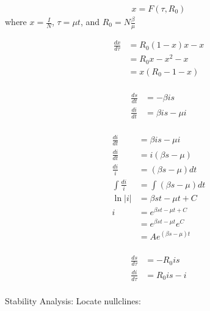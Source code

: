 \documentclass[
	date={November 6{,} 2024},
	month={11},
	day={6}
]{math486notes}
\begin{document}
\tableofcontents

\begin{equation*}
\begin{aligned}
	x = F(\tau, R_{0})
\end{aligned}
\end{equation*}
where $x = \frac{I}{N}$, $\tau = \mu t$, and $R_{0} = N\frac{\beta}{\mu}$

\begin{equation*}
\begin{aligned}
	\frac{dx}{d\tau} &= R_{0}(1-x)x - x\\
	&= R_{0}x - x^{2} - x\\
	&= x(R_{0} - 1 - x)\\
\end{aligned}
\end{equation*}

\begin{equation*}
\begin{aligned}
	\frac{ds}{dt} &= -\beta is\\
	\frac{di}{dt} &= \beta is - \mu i\\
\end{aligned}
\end{equation*}

\begin{equation*}
\begin{aligned}
	\frac{di}{dt} &= \beta is - \mu i\\
	\frac{di}{dt} &= i(\beta s - \mu)\\
	\frac{di}{i} &= (\beta s - \mu)dt\\
	\int \frac{di}{i} &= \int (\beta s - \mu)dt\\
	\ln |i| &= \beta st - \mu t + C\\
	i &= e^{\beta st - \mu t + C}\\
	  &= e^{\beta st - \mu t}e^{C}\\
	  &= Ae^{(\beta s - \mu) t}\\
\end{aligned}
\end{equation*}

\begin{equation*}
\begin{aligned}
	\frac{ds}{d\tau} &= -R_{0} is\\
	\frac{di}{d\tau} &= R_{0}is - i\\
\end{aligned}
\end{equation*}

Stability Analysis:
Locate nullclines:
\end{document}
